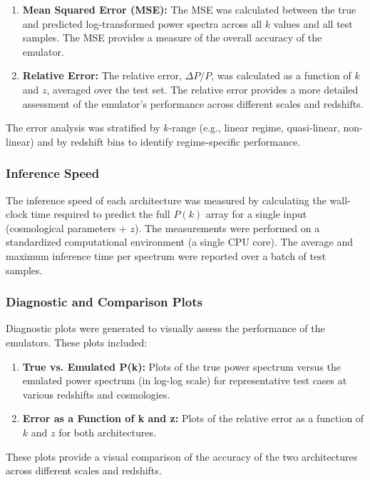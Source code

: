 \documentclass[twocolumn]{aastex631}
\begin{document}
\begin{enumerate}
    \item \textbf{Mean Squared Error (MSE):} The MSE was calculated between the true and predicted log-transformed power spectra across all $k$ values and all test samples. The MSE provides a measure of the overall accuracy of the emulator.
    \item \textbf{Relative Error:} The relative error, $\Delta P / P$, was calculated as a function of $k$ and $z$, averaged over the test set. The relative error provides a more detailed assessment of the emulator's performance across different scales and redshifts.
\end{enumerate}

The error analysis was stratified by $k$-range (e.g., linear regime, quasi-linear, non-linear) and by redshift bins to identify regime-specific performance.

\subsubsection{Inference Speed}

The inference speed of each architecture was measured by calculating the wall-clock time required to predict the full $P(k)$ array for a single input (cosmological parameters + $z$). The measurements were performed on a standardized computational environment (a single CPU core). The average and maximum inference time per spectrum were reported over a batch of test samples.

\subsubsection{Diagnostic and Comparison Plots}

Diagnostic plots were generated to visually assess the performance of the emulators. These plots included:

\begin{enumerate}
    \item \textbf{True vs. Emulated P(k):} Plots of the true power spectrum versus the emulated power spectrum (in log-log scale) for representative test cases at various redshifts and cosmologies.
    \item \textbf{Error as a Function of k and z:} Plots of the relative error as a function of $k$ and $z$ for both architectures.
\end{enumerate}

These plots provide a visual comparison of the accuracy of the two architectures across different scales and redshifts.
\end{document}

